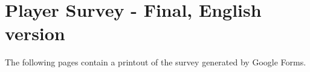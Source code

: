 \chapter{Player Survey - Final, English version}
\label{appendix:survey}

The following pages contain a printout of the survey generated by Google Forms.


